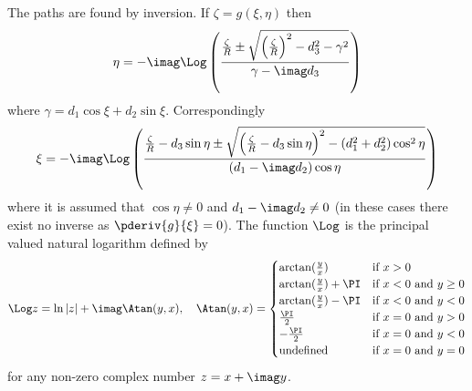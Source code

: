 The paths are found by inversion. If $\zeta=g(\xi,\eta)$ then
\begin{align*}
\eta = -\imag\Log\left(\frac{\frac{\zeta}{R}\pm\sqrt{\left(\frac{\zeta}{R}\right)^2-d_3^2-\gamma^2}}{\gamma-\imag d_3}\right)
\end{align*}
where $\gamma = d_1\cos\xi+d_2\sin\xi$. Correspondingly
\begin{equation*}
	\xi =-\imag\Log\left(\frac{\frac{\zeta}{R}-d_3\sin\eta\pm\sqrt{\left(\frac{\zeta}{R}-d_3\sin\eta\right)^2-\left(d_1^2+d_2^2\right)\cos^2\eta}}{(d_1-\imag d_2)\cos\eta}\right)
\end{equation*}
where it is assumed that $\cos\eta\not=0$ and $d_1-\imag d_2\not=0$ (in these cases there exist no inverse as $\pderiv{g}{\xi}=0$). The function $\Log$ is the principal valued natural logarithm defined by
\begin{equation*}
	\Log z= \ln|z|+\imag \Atan(y,x),\quad 
	\Atan(y,x) = \begin{cases}
	\arctan(\frac{y}{x}) & \mbox{if } x > 0\\
	\arctan(\frac{y}{x}) + \PI & \mbox{if } x < 0 \mbox{ and } y \ge 0\\
	\arctan(\frac{y}{x}) - \PI & \mbox{if } x < 0 \mbox{ and } y < 0\\
	\frac{\PI}{2} & \mbox{if } x = 0 \mbox{ and } y > 0\\
	-\frac{\PI}{2} & \mbox{if } x = 0 \mbox{ and } y < 0\\
	\text{undefined} & \mbox{if } x = 0 \mbox{ and } y = 0
	\end{cases}
\end{equation*}
for any non-zero complex number $z=x+\imag y$.

